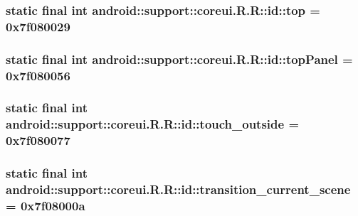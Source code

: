 \hypertarget{classandroid_1_1support_1_1coreui_1_1_r_1_1id_ba2743295dfaa42537eeef28fc2f9dde}{
\subsubsection[{top}]{\setlength{\rightskip}{0pt plus 5cm}static final int android::support::coreui.R.R::id::top = 0x7f080029}}
\label{classandroid_1_1support_1_1coreui_1_1_r_1_1id_ba2743295dfaa42537eeef28fc2f9dde}


\hypertarget{classandroid_1_1support_1_1coreui_1_1_r_1_1id_64f7abba31687c63b581e96f2ff114d2}{
\subsubsection[{topPanel}]{\setlength{\rightskip}{0pt plus 5cm}static final int android::support::coreui.R.R::id::topPanel = 0x7f080056}}
\label{classandroid_1_1support_1_1coreui_1_1_r_1_1id_64f7abba31687c63b581e96f2ff114d2}


\hypertarget{classandroid_1_1support_1_1coreui_1_1_r_1_1id_8ff63aad481d1a3d0dd230f7e60cd96d}{
\subsubsection[{touch\_\-outside}]{\setlength{\rightskip}{0pt plus 5cm}static final int android::support::coreui.R.R::id::touch\_\-outside = 0x7f080077}}
\label{classandroid_1_1support_1_1coreui_1_1_r_1_1id_8ff63aad481d1a3d0dd230f7e60cd96d}


\hypertarget{classandroid_1_1support_1_1coreui_1_1_r_1_1id_aa2f7a50a33ce117f1b84a0d6958f61c}{
\subsubsection[{transition\_\-current\_\-scene}]{\setlength{\rightskip}{0pt plus 5cm}static final int android::support::coreui.R.R::id::transition\_\-current\_\-scene = 0x7f08000a}}
\label{classandroid_1_1support_1_1coreui_1_1_r_1_1id_aa2f7a50a33ce117f1b84a0d6958f61c}


